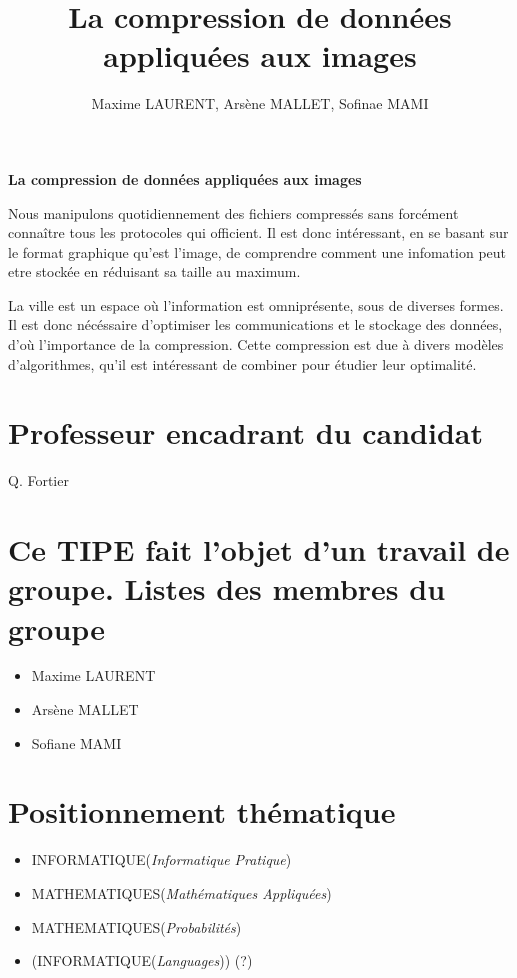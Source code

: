 \documentclass[a4paper, 11pt]{article}
\author{Maxime LAURENT, Arsène MALLET, Sofinae MAMI}
\title{La compression de donn\'ees appliqu\'ees aux images}
\begin{document}
    
\begin{center}
    {\textbf {\LARGE La compression de donn\'ees appliqu\'ees aux images}}
\end{center}

\vspace{5mm}

Nous manipulons quotidiennement des fichiers compressés sans forcément conna\^itre tous les protocoles qui officient. Il est donc intéressant, en se basant sur le format graphique qu'est l'image, de comprendre comment une infomation peut etre stockée en réduisant sa taille au maximum.

La ville est un espace où l'information est omniprésente, sous de diverses formes. Il est donc nécéssaire d'optimiser les communications et le stockage des données, d'où l'importance de la compression. Cette compression est due à divers modèles d'algorithmes, qu'il est intéressant de combiner pour étudier leur optimalité. 

\section*{Professeur encadrant du candidat}
Q. Fortier

\section*{Ce TIPE fait l'objet d'un travail de groupe. \newline Listes des membres du groupe}
\begin{itemize}
    \item Maxime LAURENT
    \item Arsène MALLET
    \item Sofiane MAMI
\end{itemize}

\section*{Positionnement th\'ematique}
\begin{itemize}
    \item INFORMATIQUE(\textit{Informatique Pratique})
    \item MATHEMATIQUES(\textit{Math\'ematiques Appliqu\'ees})
    \item MATHEMATIQUES(\textit{Probabilit\'es})
    \item \scriptsize{(INFORMATIQUE(\textit{Languages}))} (?)
\end{itemize}
\end{document}
